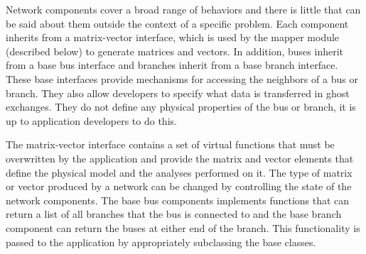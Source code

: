 \documentclass[preprint]{acm_proc_article-sp}
\begin{document}
Network components cover a broad range of behaviors and there is little that can be
said about them outside the context of a specific problem. Each component inherits from a
matrix-vector interface, which is used by the mapper module (described below) to
generate matrices and vectors. In addition, buses inherit from a base bus
interface and branches inherit from a base branch interface. These base interfaces provide
mechanisms for accessing the neighbors of a bus or branch. They also allow
developers to specify
what data is transferred in ghost exchanges. They do not define any physical
properties of
the bus or branch, it is up to application developers to do this.

The matrix-vector interface contains a set of virtual functions that must be
overwritten by the application and provide the matrix and vector elements that
define the physical model and the analyses performed on it. The type of matrix
or vector produced by a network can be changed by controlling the state of the
network components. The base bus components implements functions that can return
a list of all branches that the bus is connected to and the base branch
component can return the buses at either end of the branch. This functionality
is passed to the application by appropriately subclassing the base classes.
\end{document}
